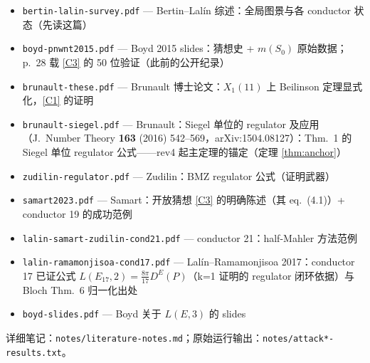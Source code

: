 \documentclass[11pt,a4paper]{ctexart}
\theoremstyle{remark}
\begin{document}
\begin{itemize}[nosep]
\item \texttt{bertin-lalin-survey.pdf} — Bertin--Lal\'in 综述：全局图景与各 conductor 状态（先读这篇）
\item \texttt{boyd-pnwnt2015.pdf} — Boyd 2015 slides：猜想史 + $m(S_0)$ 原始数据；p.~28 载 \eqref{C3} 的 50 位验证（此前的公开纪录）
\item \texttt{brunault-these.pdf} — Brunault 博士论文：$X_1(11)$ 上 Beilinson 定理显式化，\eqref{C1} 的证明
\item \texttt{brunault-siegel.pdf} — Brunault：Siegel 单位的 regulator 及应用（J.~Number Theory \textbf{163} (2016) 542--569，arXiv:1504.08127）：Thm.~1 的 Siegel 单位 regulator 公式——rev4 起主定理的锚定（定理 \ref{thm:anchor}）
\item \texttt{zudilin-regulator.pdf} — Zudilin：BMZ regulator 公式（证明武器）
\item \texttt{samart2023.pdf} — Samart：开放猜想 \eqref{C3} 的明确陈述（其 eq.~(4.1)）+ conductor 19 的成功范例
\item \texttt{lalin-samart-zudilin-cond21.pdf} — conductor 21：half-Mahler 方法范例
\item \texttt{lalin-ramamonjisoa-cond17.pdf} — Lal\'in--Ramamonjisoa 2017：conductor 17
已证公式 $L(E_{17},2)=\frac{8\pi}{17}D^E(P)$（k=1 证明的 regulator 闭环依据）与
Bloch Thm.~6 归一化出处
\item \texttt{boyd-slides.pdf} — Boyd 关于 $L(E,3)$ 的 slides
\end{itemize}
详细笔记：\texttt{notes/literature-notes.md}；原始运行输出：\texttt{notes/attack*-results.txt}。
\end{document}
